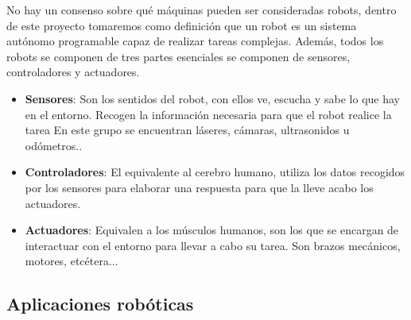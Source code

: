 No hay un consenso sobre qué máquinas pueden ser consideradas robots,
dentro de este proyecto tomaremos como definición que un robot es un sistema autónomo programable capaz de realizar tareas complejas. Además, todos los robots se componen de tres partes esenciales  se componen de sensores, controladores y actuadores.
\begin{itemize}
    \item \textbf{Sensores}: Son los sentidos del robot, con ellos ve, escucha y sabe lo que hay en el entorno. Recogen la información necesaria para que el robot realice la tarea En este grupo se encuentran láseres, cámaras, ultrasonidos u odómetros..
    \item \textbf{Controladores}: El equivalente al cerebro humano, utiliza los datos recogidos por los sensores para elaborar una respuesta para que la lleve acabo los actuadores.
    \item \textbf{Actuadores}: Equivalen a los músculos humanos, son los que se encargan de interactuar con el entorno para llevar a cabo su tarea. Son brazos mecánicos, motores, etcétera...
\end{itemize}

\subsection{Aplicaciones robóticas}

